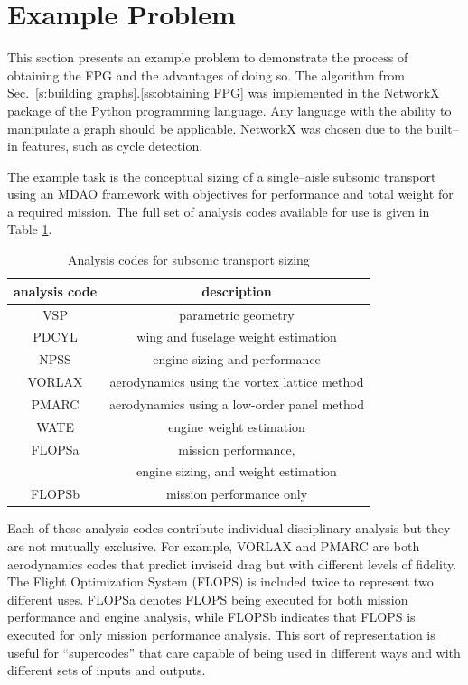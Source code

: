 \section{Example Problem}
	\label{s:example problem}
	This section presents an example problem to demonstrate the process of obtaining the FPG and the advantages of doing so. The algorithm from Sec.~\ref{s:building graphs}.\ref{ss:obtaining FPG} was implemented in the NetworkX package of the Python programming language. Any language with the ability to manipulate a graph should be applicable. NetworkX was chosen due to the built--in features, such as cycle detection.

	The example task is the conceptual sizing of a single--aisle subsonic transport using an MDAO framework with objectives for performance and total weight for a required mission. The full set of analysis codes available for use is given in Table \ref{t:analysis codes}.
	\begin{table}[htbp]
	  \centering
	  \caption{Analysis codes for subsonic transport sizing}
		\begin{tabular}{cc}
		\toprule
		analysis code & description \\
		\midrule
		VSP   & parametric geometry \\
		PDCYL & wing and fuselage weight estimation \\
		NPSS  & engine sizing and performance \\
		VORLAX & aerodynamics using the vortex lattice method \\
		PMARC & aerodynamics using a low-order panel method \\
		WATE  & engine weight estimation \\
		FLOPSa & mission performance, \\
		  & engine sizing, and weight estimation \\
		FLOPSb & mission performance only \\
		\bottomrule
		\end{tabular}%
	  \label{t:analysis codes}%
	\end{table}%
	Each of these analysis codes contribute individual disciplinary analysis but they are not mutually exclusive. For example, VORLAX and PMARC are both aerodynamics codes that predict inviscid drag but with different levels of fidelity. The Flight Optimization System (FLOPS) is included twice to represent two different uses. FLOPSa denotes FLOPS being executed for both mission performance and engine analysis, while FLOPSb indicates that FLOPS is executed for only mission performance analysis. This sort of representation is useful for ``supercodes'' that care capable of being used in different ways and with different sets of inputs and outputs.

